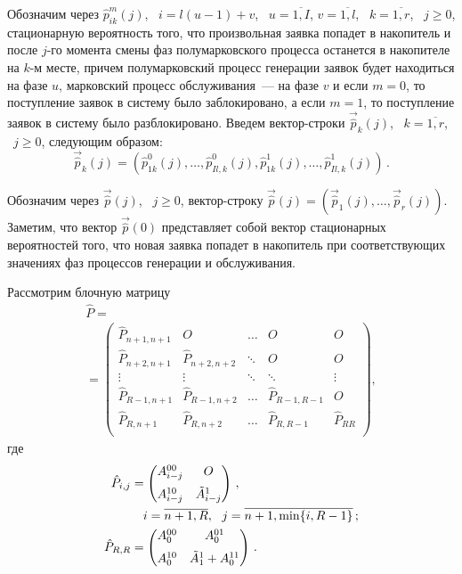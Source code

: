 \begin{multicols}{2}
Обозначим через
$\hat p_{ik}^m(j)$, \ $i=l(u-1)+v$, \ $u=\overline{1,I}$,  $v=\overline{1,l}$, \ $k=\overline{1,r}$, \ $j\ge 0$,
стационарную вероятность того, что произвольная заявка
попадет в накопитель и после $j$-го момента смены фаз полумарковского процесса
останется в накопителе на $k$-м месте, причем
полумарковский процесс генерации заявок будет находиться на фазе $u$,
марковский процесс обслуживания~--- на фазе $v$ и
если $m=0$, то поступление заявок в систему было заблокировано,
а если $m=1$, то поступление заявок в систему было разблокировано.
Введем вектор-строки $\vec{\hat p}_k(j)$, \ $k=\overline{1,r}$, \ $j\ge 0$, следующим образом:
$$
\vec{\hat p}_k(j)=(\hat p_{1k}^0(j),\ldots,\hat p_{Il,k}^0(j),\hat p_{1k}^1(j),\ldots,\hat p_{Il,k}^1(j))\,.
$$

Обозначим через $\vec{\hat p}(j)$, \ $j\ge 0$,
вектор-строку $\vec{\hat p}(j)=(\vec{\hat p}_{1}(j),\ldots,\vec{\hat p}_{r}(j))$.
Заметим, что вектор $\vec{\hat p}(0)$ представляет собой вектор стационарных вероятностей того,
что новая заявка попадет в накопитель при соответствующих значениях
фаз процессов генерации и обслуживания.

Рассмотрим блочную матрицу
\begin{multline}
\label{hat_P}
\hat P={}\\
{}=
\begin{pmatrix}
\hat P_{n+1,n+1}\!\! &\!\! O      \!\!          &\!\! \ldots\!\! &\!\! O \!\!               &\!\! O\\
\hat P_{n+2,n+1}\!\! &\!\! \hat P_{n+2,n+2}\!\! &\!\! \ddots\!\! &\!\! O   \!\!             &\!\! O\\
\vdots          \!\! &\!\! \vdots          \!\! &\!\! \ddots\!\! &\!\! \ddots\!\!                &\!\! \vdots\\
\hat P_{R-1,n+1}\!\! & \!\! \hat P_{R-1,n+2}\!\! &\!\! \ldots\!\! &\!\! \hat P_{R-1,R-1}\!\! &\!\! O\\
\hat P_{R,n+1}  \!\! & \!\! \hat P_{R,n+2}  \!\! &\!\! \ldots\!\! &\!\! \hat P_{R,R-1}  \!\! &\!\! \hat P_{RR}\\
\end{pmatrix},
\end{multline}
где
\begin{align*}
\hat P_{i,j}&=
\begin{pmatrix}
A^{00}_{i-j} & O \\[6pt]
A^{10}_{i-j} & \Tilde A^{1}_{i-j} \\
\end{pmatrix}\,, 
\\
&\ \ \ i=\overline{n+1,R}, \ \ j=\overline{n+1,\min\{i,R-1\}}\,;
\\
\hat P_{R,R}&=
\begin{pmatrix}
A^{00}_{0} & A^{01}_{0}\\[6pt]
A^{10}_{0} & \Tilde A^{1}_{1}+A^{11}_{0}\\
\end{pmatrix}\,.
\end{align*}


\end{multicols}
